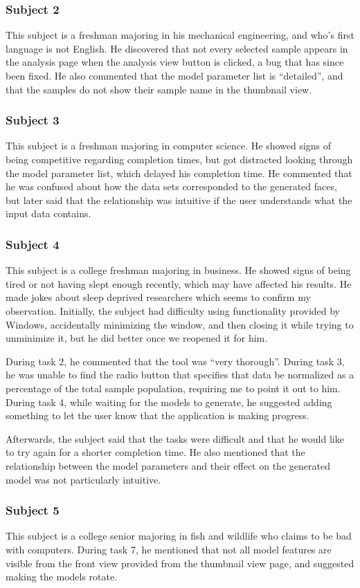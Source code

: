 \documentclass[letterpaper,10pt, onecolumn, draftclsnofoot]{IEEEtran}
\begin{document}
\subsubsection{Subject 2}
This subject is a freshman majoring in his mechanical engineering, and who's first language is not English. He discovered that not every selected sample appears in the analysis page when the analysis view button is clicked, a bug that has since been fixed. He also commented that the model parameter list is ``detailed'', and that the samples do not show their sample name in the thumbnail view.

\subsubsection{Subject 3}
This subject is a freshman majoring in computer science. He showed signs of being competitive regarding completion times, but got distracted looking through the model parameter list, which delayed his completion time. He commented that he was confused about how the data sets corresponded to the generated faces, but later said that the relationship was intuitive if the user understands what the input data contains.

\subsubsection{Subject 4}
This subject is a college freshman majoring in business. He showed signs of being tired or not having slept enough recently, which may have affected his results. He made jokes about sleep deprived researchers which seems to confirm my observation. Initially, the subject had difficulty using functionality provided by Windows, accidentally minimizing the window, and then closing it while trying to unminimize it, but he did better once we reopened it for him. 

During task 2, he commented that the tool was ``very thorough''. During task 3, he was unable to find the radio button that specifies that data be normalized as a percentage of the total sample population, requiring me to point it out to him. During task 4, while waiting for the models to generate, he suggested adding something to let the user know that the application is making progress.

Afterwards, the subject said that the tasks were difficult and that he would like to try again for a shorter completion time. He also mentioned that the relationship between the model parameters and their effect on the generated model was not particularly intuitive.

\subsubsection{Subject 5}
This subject is a college senior majoring in fish and wildlife who claims to be bad with computers. During task 7, he mentioned that not all model features are visible from the front view provided from the thumbnail view page, and suggested making the models rotate.
\end{document}
